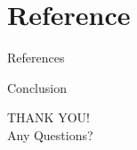 \documentclass{beamer}
\begin{document}
    \section{Reference}
    \begin{frame}{References}
        
        
    \end{frame}

    \begin{frame}{Conclusion}
        \begin{center}
            \Huge T\huge HANK \Huge Y\huge OU\Huge!\\
            \vspace{1em}
            \Large Any Questions?
        \end{center}
    \end{frame}
\end{document}
